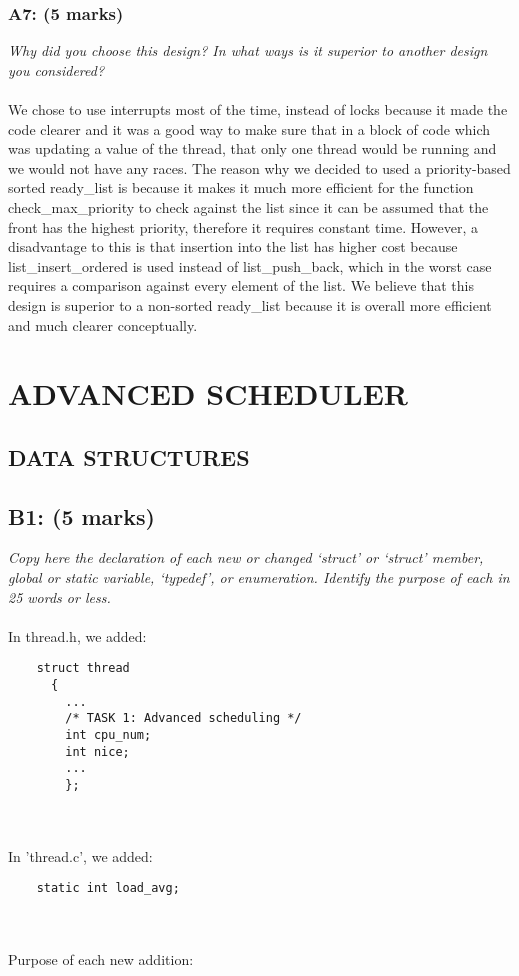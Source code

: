 \documentclass{article}
\begin{document}
\subsubsection*{A7: (5 marks) }
\textit{Why did you choose this design?  In what ways is it superior to another design you considered?}
\\ \\
We chose to use interrupts most of the time, instead of locks because it made the code clearer and it was a good way to make sure that in a block of code which was updating a value of the thread, that only one thread would be running and we would not have any races.
The reason why we decided to used a priority-based sorted ready\_list is because it makes it much more efficient for the function check\_max\_priority to check against the list since it can be assumed that the front has the highest priority, therefore it requires constant time. However, a disadvantage to this is that insertion into the list has higher cost because list\_insert\_ordered is used instead of list\_push\_back, which in the worst case requires a comparison against every element of the list. We believe that this design is superior to a non-sorted ready\_list because it is overall more efficient and much clearer conceptually.

\section{ADVANCED SCHEDULER}

\subsection{DATA STRUCTURES}

\subsection*{B1: (5 marks) }

\textit{Copy here the declaration of each new or changed ‘struct’ or ‘struct’ member, global or static variable, ‘typedef’, or enumeration. Identify the purpose of each in 25 words or less.}
\\\\
In thread.h, we added:
\begin{lstlisting}
    struct thread
      {
        ...
        /* TASK 1: Advanced scheduling */
        int cpu_num;
        int nice;
        ...
        };
\end{lstlisting}
\\\\
In 'thread.c', we added:
\begin{lstlisting}
    static int load_avg;
\end{lstlisting}
 \\\\
Purpose of each new addition:
\end{document}
